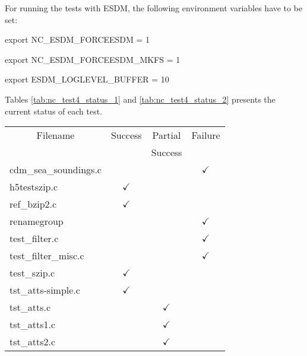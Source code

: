 For running the tests with ESDM, the following environment variables have to be set:

\begin{framed}
\hspace{2cm} export NC\_ESDM\_FORCEESDM = 1

\hspace{2cm} export NC\_ESDM\_FORCEESDM\_MKFS = 1

\hspace{2cm} export ESDM\_LOGLEVEL\_BUFFER = 10
\end{framed}

Tables \ref{tab:nc_test4_status_1} and \ref{tab:nc_test4_status_2} presents the current status of each test.

\begin{table}[H]
\centering
\begin{tabular}{|l|c|c|c|}
\hline
\multicolumn{1}{|c|}{\parbox{8cm}{\centering Filename}} & \multicolumn{1}{c|}{Success} & \multicolumn{1}{c|}{Partial} & \multicolumn{1}{c|}{Failure} \\
                        &               & Success       &               \\ \hline \hline
cdm\_sea\_soundings.c   &               &               & $\checkmark$  \\ \hline
h5testszip.c            & $\checkmark$  &               &               \\ \hline
ref\_bzip2.c            & $\checkmark$  &               &               \\ \hline
renamegroup             &               &               & $\checkmark$  \\ \hline
test\_filter.c          &               &               & $\checkmark$  \\ \hline
test\_filter\_misc.c    &               &               & $\checkmark$  \\ \hline
test\_szip.c            & $\checkmark$  &               &               \\ \hline
tst\_atts-simple.c      & $\checkmark$  &               &               \\ \hline
tst\_atts.c             &               & $\checkmark$  &               \\ \hline
tst\_atts1.c            &               & $\checkmark$  &               \\ \hline
tst\_atts2.c            &               & $\checkmark$  &               \\ \hline

\end{tabular}
\end{table}
